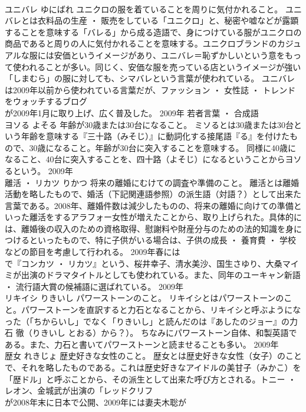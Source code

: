 \documentclass[8pt]{extreport}
\begin{document}
\begin{CJK}{UTF8}{min}
\\	ユニバレ	ゆにばれ	ユニクロの服を着ていることを周りに気付かれること。	ユニバレとは衣料品の生産 ・ 販売をしている「ユニクロ」と、秘密や嘘などが露顕することを意味する「バレる」から成る造語で、身につけている服がユニクロの商品であると周りの人に気付かれることを意味する。ユニクロブランドのカジュアルな服には安価というイメージがあり、ユニバレ＝恥ずかしいという意をもって使われることが多い。同じく、安価な服を売っている店というイメージが強い「しまむら」の服に対しても、シマバレという言葉が使われている。 ユニバレは2009年以前から使われている言葉だが、ファッション ・ 女性誌 ・ トレンドをウォッチするブログ
\\	が2009年1月に取り上げ、広く普及した。	2009年	若者言葉 ・ 合成語	
\\	ヨソる	よそる	年齢が30歳または30台になること。	ミソるとは30歳または30台という年齢を意味する『三十路（みそじ）』に動詞化する接尾語『る』を付けたもので、30歳になること。年齢が30台に突入することを意味する。 同様に40歳になること、40台に突入することを、四十路（よそじ）になるということからヨソるという。	2009年	
\\	離活 ・ リカツ	りかつ	将来の離婚にむけての調査や準備のこと。	離活とは離婚活動を略したもので、婚活（下記関連語参照）の派生語（対語？）として出来た言葉である。2008年、離婚件数は減少したものの、将来の離婚に向けての準備といった離活をするアラフォー女性が増えたことから、取り上げられた。具体的には、離婚後の収入のための資格取得、慰謝料や財産分与のための法的知識を身につけるといったもので、特に子供がいる場合は、子供の成長 ・ 養育費 ・ 学校などの節目を考慮して行われる。 2009年春には
\\	で『コンカツ ・ リカツ』という、桜井幸子、清水美沙、国生さゆり、大桑マイミが出演のドラマタイトルとしても使われている。また、同年のユーキャン新語 ・ 流行語大賞の候補語に選ばれている。	2009年	
\\	リキイシ	りきいし	パワーストーンのこと。	リキイシとはパワーストーンのこと。パワーストーンを直訳すると力石となることから、リキイシと呼ぶようになった（「ちからいし」でなく「りきいし」と読んだのは『あしたのジョー』の力石 徹（りきいし とおる）から？）。 ちなみにパワーストーン自体、和製英語である。また、力石と書いてパワーストーンと読ませることも多い。	2009年	
\\	歴女	れきじょ	歴史好きな女性のこと。	歴女とは歴史好きな女性（女子）のことで、それを略したものである。これは歴史好きなアイドルの美甘子（みかこ）を「歴ドル」と呼ぶことから、その派生として出来た呼び方とされる。トニー ・ レオン、金城武が出演の「レッドクリフ 
\\	が2008年末に日本で公開、2009年には妻夫木聡が

\end{CJK}
\end{document}
